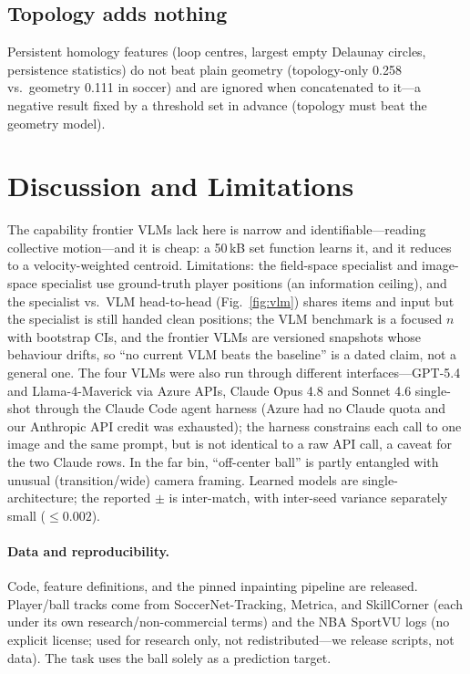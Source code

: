 \subsection{Topology adds nothing}
Persistent homology features (loop centres, largest empty Delaunay circles, persistence
statistics) do not beat plain geometry (topology-only 0.258 vs.\ geometry 0.111 in soccer)
and are ignored when concatenated to it---a negative result fixed by a threshold set in
advance (topology must beat the geometry model).

\section{Discussion and Limitations}
The capability frontier VLMs lack here is narrow and identifiable---reading collective
motion---and it is cheap: a 50\,kB set function learns it, and it reduces to a
velocity-weighted centroid. Limitations: the field-space specialist and image-space
specialist use ground-truth player positions (an information ceiling), and the specialist
vs.\ VLM head-to-head (Fig.~\ref{fig:vlm}) shares items and input but the specialist is
still handed clean positions; the VLM benchmark is a focused $n$ with bootstrap CIs, and
the frontier VLMs are versioned snapshots whose behaviour drifts, so ``no current VLM beats
the baseline'' is a dated claim, not a general one. The four VLMs were also run through
different interfaces---GPT-5.4 and Llama-4-Maverick via Azure APIs, Claude Opus 4.8 and
Sonnet 4.6 single-shot through the Claude Code agent harness (Azure had no Claude quota and
our Anthropic API credit was exhausted); the harness constrains each call to one image and
the same prompt, but is not identical to a raw API call, a caveat for the two Claude rows.
In the far bin, ``off-center ball'' is partly entangled with unusual (transition/wide)
camera framing. Learned models are single-architecture; the reported $\pm$ is inter-match,
with inter-seed variance separately small ($\le0.002$).

\paragraph{Data and reproducibility.} Code, feature definitions, and the pinned inpainting
pipeline are released. Player/ball tracks come from SoccerNet-Tracking, Metrica, and
SkillCorner (each under its own research/non-commercial terms) and the NBA SportVU logs
(no explicit license; used for research only, not redistributed---we release scripts, not
data). The task uses the ball solely as a prediction target.

